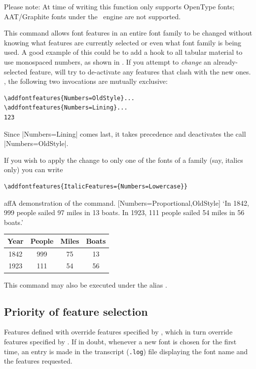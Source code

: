 \documentclass[a4paper]{l3doc}
\begin{document}
Please note: At time of writing this function only supports OpenType fonts; AAT/Graphite fonts under the \XeTeX\ engine are not supported.



This command allows font features in an entire font family to
be changed without knowing what features are currently selected or even what
font family is being used. A good example of this could be to add a hook to all
tabular material to use monospaced numbers, as shown in .
If you attempt to \emph{change} an already-selected feature,  will try to de-activate any features that clash with the new ones.
\Eg, the following two invocations are mutually exclusive:
\begin{Verbatim}
\addfontfeatures{Numbers=OldStyle}...
\addfontfeatures{Numbers=Lining}...
123
\end{Verbatim}
Since |Numbers=Lining| comes last, it takes precedence and deactivates the call |Numbers=OldStyle|.

If you wish to apply the change to only one of the fonts of a family (say, italics only)
you can write
\begin{Verbatim}
\addfontfeatures{ItalicFeatures={Numbers=Lowercase}}
\end{Verbatim}


\begin{Lexample}{aff}{A demonstration of the  command.}
           [Numbers={Proportional,OldStyle}]
  `In 1842, 999 people sailed 97 miles in
   13 boats. In 1923, 111 people sailed 54
   miles in 56 boats.'            \bigskip

  {
  \begin{tabular}{@{} cccc @{}}
            Year & People & Miles & Boats \\
    \hline  1842 &  999   &  75   &  13   \\
            1923 &  111   &  54   &  56
  \end{tabular}}
\end{Lexample}

\DescribeMacro{\addfontfeature}
This command may also be executed under the alias \cmd{\addfontfeature}.


\subsection{Priority of feature selection}
Features defined with  override features
specified by , which in turn override features
specified by .  If in doubt, whenever a
new font is chosen for the first time, an entry is made in the
transcript (\texttt{.log}) file displaying the font name and the
features requested.
\end{document}
